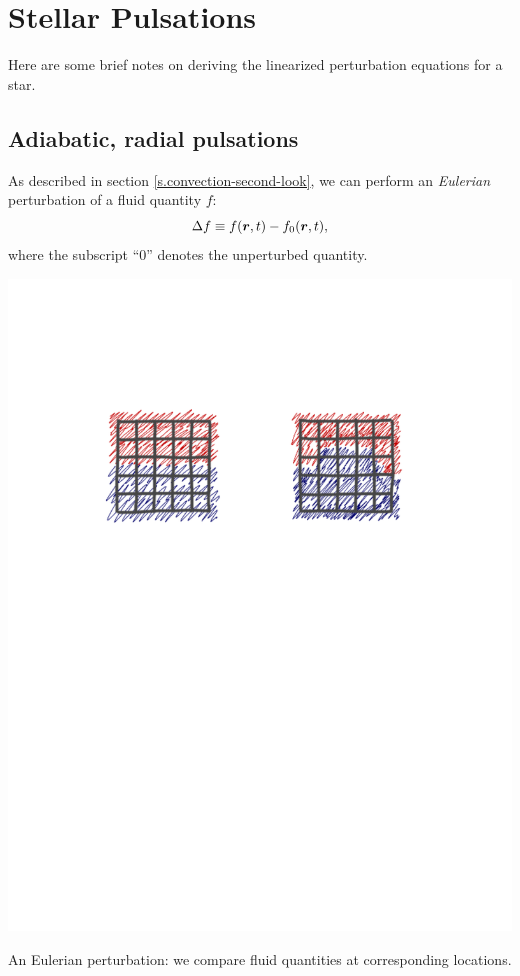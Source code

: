 
\chapter{Stellar Pulsations}\label{s.pulsations}

Here are some brief notes on deriving the linearized perturbation equations for a star.

\section{Adiabatic, radial pulsations}\label{s.adiabatic-radial}
As described in section \ref{s.convection-second-look}, we can perform an \emph{Eulerian} perturbation of a fluid quantity $f$:
\begin{equation}
  \Delta f \equiv f(\boldsymbol{r},t)-f_{0}(\boldsymbol{r},t),
\end{equation}
where the subscript ``0'' denotes the unperturbed quantity. 
\begin{marginfigure}
\includegraphics[width=\linewidth]{graphics/eulerian}
\caption{\label{f.eulerian-grid} An Eulerian perturbation: we compare fluid quantities at corresponding locations.}
\end{marginfigure}
